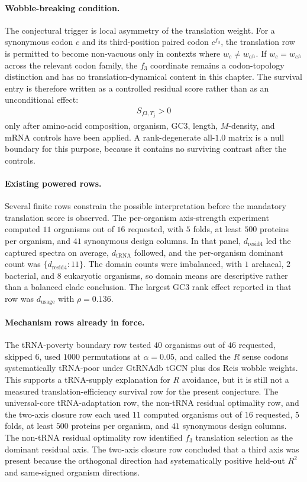 \paragraph{Wobble-breaking condition.}
The conjectural trigger is local asymmetry of the translation weight. For a synonymous codon $c$ and its third-position paired codon $c^{f_3}$, the translation row is permitted to become non-vacuous only in contexts where $w_c \neq w_{c^{f_3}}$. If $w_c = w_{c^{f_3}}$ across the relevant codon family, the $f_3$ coordinate remains a codon-topology distinction and has no translation-dynamical content in this chapter. The survival entry is therefore written as a controlled residual score rather than as an unconditional effect:
$$
\begin{aligned}
S_{f3,T_j} > 0
\end{aligned}
$$
only after amino-acid composition, organism, GC3, length, $M$-density, and mRNA controls have been applied. A rank-degenerate all-$1.0$ matrix is a null boundary for this purpose, because it contains no surviving contrast after the controls.

\paragraph{Existing powered rows.}
Several finite rows constrain the possible interpretation before the mandatory translation score is observed. The per-organism axis-strength experiment computed $11$ organisms out of $16$ requested, with $5$ folds, at least $500$ proteins per organism, and $41$ synonymous design columns. In that panel, $d_{\mathrm{resid4}}$ led the captured spectra on average, $d_{\mathrm{tRNA}}$ followed, and the per-organism dominant count was $\{d_{\mathrm{resid4}}:11\}$. The domain counts were imbalanced, with $1$ archaeal, $2$ bacterial, and $8$ eukaryotic organisms, so domain means are descriptive rather than a balanced clade conclusion. The largest GC3 rank effect reported in that row was $d_{\mathrm{usage}}$ with $\rho = 0.136$.

\paragraph{Mechanism rows already in force.}
The tRNA-poverty boundary row tested $40$ organisms out of $46$ requested, skipped $6$, used $1000$ permutations at $\alpha = 0.05$, and called the $R$ sense codons systematically tRNA-poor under GtRNAdb tGCN plus dos Reis wobble weights. This supports a tRNA-supply explanation for $R$ avoidance, but it is still not a measured translation-efficiency survival row for the present conjecture. The universal-core tRNA-adaptation row, the non-tRNA residual optimality row, and the two-axis closure row each used $11$ computed organisms out of $16$ requested, $5$ folds, at least $500$ proteins per organism, and $41$ synonymous design columns. The non-tRNA residual optimality row identified $f_3$ translation selection as the dominant residual axis. The two-axis closure row concluded that a third axis was present because the orthogonal direction had systematically positive held-out $R^2$ and same-signed organism directions.

